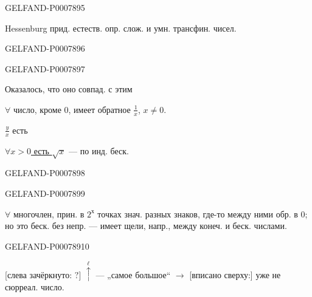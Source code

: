 \begin{GelfandAdjacentEvidence}{GELFAND-P000789}{5}


Hessenburg прид. естеств. опр. слож. и умн. трансфин. чисел.
\end{GelfandAdjacentEvidence}
\begin{GelfandAdjacentEvidence}{GELFAND-P000789}{6}

\end{GelfandAdjacentEvidence}
\begin{GelfandAdjacentEvidence}{GELFAND-P000789}{7}


Оказалось, что оно совпад. с этим

\(\forall\) число, кроме \(0\), имеет обратное \(\frac1x\), \(x\ne0\).

\(\frac yx\) есть

\underline{\(\forall x>0\) есть \(\sqrt{x}\)} --- по инд. беск.
\end{GelfandAdjacentEvidence}
\begin{GelfandAdjacentEvidence}{GELFAND-P000789}{8}

\end{GelfandAdjacentEvidence}
\begin{GelfandAdjacentEvidence}{GELFAND-P000789}{9}


\(\forall\) многочлен, прин. в \(2^{\text{х}}\) точках знач. разных знаков, где-то между ними обр. в \(0\); но это беск. без непр. --- имеет щели, напр., между конеч. и беск. числами.
\end{GelfandAdjacentEvidence}
\begin{GelfandAdjacentEvidence}{GELFAND-P000789}{10}


[слева зачёркнуто: \sout{\(?\)}] \(\overset{\ell}{\uparrow}\) --- „самое большое“
\(\longrightarrow\) [вписано сверху:] уже не сюрреал. число.
\end{GelfandAdjacentEvidence}
